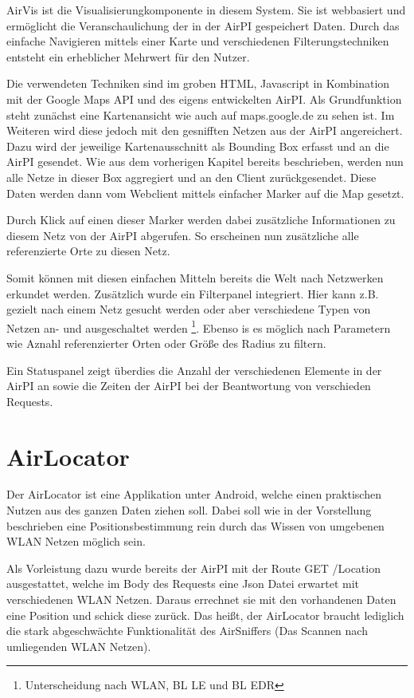 \documentclass[11pt,a4paper]{article}
\begin{document}
AirVis ist die Visualisierungkomponente in diesem System. Sie ist webbasiert und ermöglicht die Veranschaulichung der in der AirPI gespeichert Daten. Durch das einfache Navigieren mittels einer Karte und verschiedenen Filterungstechniken entsteht ein erheblicher Mehrwert für den Nutzer.

Die verwendeten Techniken sind im groben HTML, Javascript in Kombination mit der Google Maps API und des eigens entwickelten AirPI. Als Grundfunktion steht zunächst eine Kartenansicht wie auch auf maps.google.de zu sehen ist. Im Weiteren wird diese jedoch mit den gesnifften Netzen aus der AirPI angereichert. Dazu wird der jeweilige Kartenausschnitt als Bounding Box erfasst und an die AirPI gesendet. Wie aus dem vorherigen Kapitel bereits beschrieben, werden nun alle Netze in dieser Box aggregiert und an den Client zurückgesendet. Diese Daten werden dann vom Webclient mittels einfacher Marker auf die Map gesetzt.

Durch Klick auf einen dieser Marker werden dabei zusätzliche Informationen zu diesem Netz von der AirPI abgerufen. So erscheinen nun zusätzliche alle referenzierte Orte zu diesen Netz.

Somit können mit diesen einfachen Mitteln bereits die Welt nach Netzwerken erkundet werden. Zusätzlich wurde ein Filterpanel integriert. Hier kann z.B. gezielt nach einem Netz gesucht werden oder aber verschiedene Typen von Netzen an- und ausgeschaltet werden
\footnote{Unterscheidung nach WLAN, BL LE und BL EDR}.
Ebenso is es möglich nach Parametern wie Aznahl referenzierter Orten oder Größe des Radius zu filtern. 

Ein Statuspanel zeigt überdies die Anzahl der verschiedenen Elemente in der AirPI an sowie die Zeiten der AirPI bei der Beantwortung von verschieden Requests.

\section{AirLocator}

Der AirLocator ist eine Applikation unter Android, welche einen praktischen Nutzen aus des ganzen Daten ziehen soll. Dabei soll wie in der Vorstellung beschrieben eine Positionsbestimmung rein durch das Wissen von umgebenen WLAN Netzen möglich sein. 

Als Vorleistung dazu wurde bereits der AirPI mit der Route GET /Location ausgestattet, welche im Body des Requests eine Json Datei erwartet mit verschiedenen WLAN Netzen. Daraus errechnet sie mit den vorhandenen Daten eine Position und schick diese zurück. Das heißt, der AirLocator braucht lediglich die stark abgeschwächte Funktionalität des AirSniffers (Das Scannen nach umliegenden WLAN Netzen).
\end{document}
